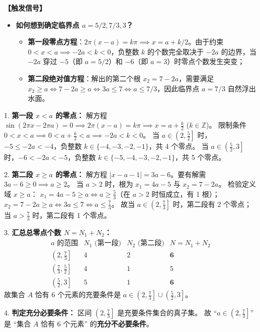 \documentclass[11pt,a4paper,fontset=fandol]{ctexart}
\begin{document}
\noindent\textbf{【触发信号】}
\begin{itemize}[leftmargin=1.5em]
  \item \textbf{如何想到确定临界点 $a = 5/2, 7/3, 3$？}
    \begin{itemize}[leftmargin=1.2em,label=$\circ$]
      \item \textbf{第一段零点方程}：$2\pi(x-a) = k\pi \implies x = a + k/2$。由于约束 $0 < x < a \implies -2a < k < 0$，负整数 $k$ 的个数完全取决于 $-2a$ 的边界，当 $-2a$ 穿过 $-5$（即 $a=5/2$）和 $-6$（即 $a=3$）时零点个数发生突变；
      \item \textbf{第二段绝对值方程}：解出的第二个根 $x_2 = 7-2a$，需要满足 $x_2 \ge a \iff 7-2a \ge a \iff 3a \le 7 \iff a \le 7/3$，因此临界点 $a = 7/3$ 自然浮出水面。
    \end{itemize}
\end{itemize}

1. \textbf{第一段 $x < a$ 的零点：}
解方程 $\sin(2\pi x - 2\pi a) = 0 \implies 2\pi(x - a) = k\pi \implies x = a + \frac{k}{2}$ ($k \in \mathbb{Z}$)。
限制条件 $0 < x < a \implies 0 < a + \frac{k}{2} < a \implies -2a < k < 0$。
当 $a \in \left(2, \frac{5}{2}\right]$ 时，$-5 \le -2a < -4$，负整数 $k \in \{-4, -3, -2, -1\}$，共 4 个零点。
当 $a \in \left(\frac{5}{2}, 3\right]$ 时，$-6 < -2a < -5$，负整数 $k \in \{-5, -4, -3, -2, -1\}$，共 5 个零点。

2. \textbf{第二段 $x \ge a$ 的零点：}
解方程 $|x - a - 1| = 3a - 6$。要有解需 $3a - 6 \ge 0 \implies a \ge 2$。
当 $a > 2$ 时，根为 $x_1 = 4a - 5$ 与 $x_2 = 7 - 2a$。
检验定义域 $x \ge a$：
$x_1 = 4a - 5 \ge a \iff a \ge \frac{5}{3}$（在 $a > 2$ 时恒成立，有 1 根）；
$x_2 = 7 - 2a \ge a \iff 3a \le 7 \iff a \le \frac{7}{3}$。
故当 $a \in \left(2, \frac{7}{3}\right]$ 时，第二段有 2 个零点；当 $a > \frac{7}{3}$ 时，第二段有 1 个零点。

3. \textbf{汇总总零点个数 $N = N_1 + N_2$：}
\[
\begin{array}{c|c|c|c}
a \text{ 的范围} & N_1 \text{ (第一段)} & N_2 \text{ (第二段)} & N = N_1 + N_2 \\ \hline
\left(2, \frac{7}{3}\right] & 4 & 2 & \mathbf{6} \\
\left(\frac{7}{3}, \frac{5}{2}\right] & 4 & 1 & 5 \\
\left(\frac{5}{2}, 3\right] & 5 & 1 & \mathbf{6}
\end{array}
\]
故集合 $A$ 恰有 6 个元素的充要条件是 $a \in \left(2, \frac{7}{3}\right] \cup \left(\frac{5}{2}, 3\right]$。

4. \textbf{判定充分必要条件：}
区间 $\left(2, \frac{7}{3}\right]$ 是充要条件集合的真子集。
故 “$a \in \left(2, \frac{7}{3}\right]$” 是 “集合 $A$ 恰有 6 个元素” 的\textbf{充分不必要条件}。
\end{document}
